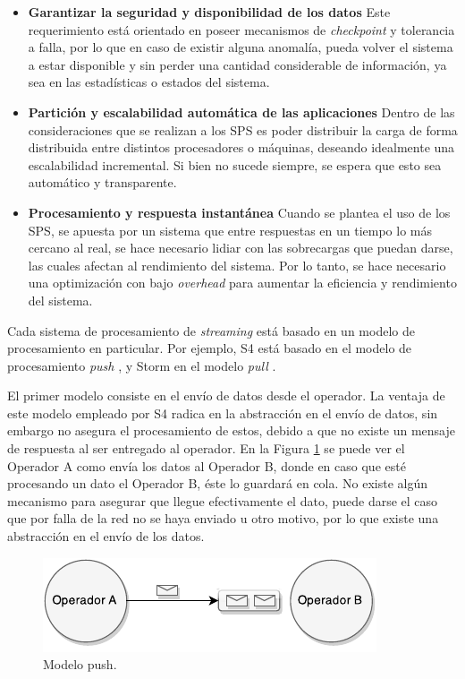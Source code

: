 \begin{itemize}
	\item \textbf{Garantizar la seguridad y disponibilidad de los datos} Este requerimiento está orientado en poseer mecanismos de \textit{checkpoint} y tolerancia a falla, por lo que en caso de existir alguna anomalía, pueda volver el sistema a estar disponible y sin perder una cantidad considerable de información, ya sea en las estadísticas o estados del sistema.
	\item \textbf{Partición y escalabilidad automática de las aplicaciones} Dentro de las consideraciones que se realizan a los SPS es poder distribuir la carga de forma distribuida entre distintos procesadores o máquinas, deseando idealmente una escalabilidad incremental. Si bien no sucede siempre, se espera que esto sea automático y transparente.
	\item \textbf{Procesamiento y respuesta instantánea} Cuando se plantea el uso de los SPS, se apuesta por un sistema que entre respuestas en un tiempo lo más cercano al real, se hace necesario lidiar con las sobrecargas que puedan darse, las cuales afectan al rendimiento del sistema. Por lo tanto, se hace necesario una optimización con bajo \textit{overhead} para aumentar la eficiencia y rendimiento del sistema.
\end{itemize}

Cada sistema de procesamiento de \textsl{streaming} está basado en un modelo de procesamiento en particular. Por ejemplo, S4 está basado en el modelo de procesamiento \textsl{push} \citep{s4yahoo}, y Storm en el modelo \textsl{pull} \citep{stormtwitter}.

El primer modelo consiste en el envío de datos desde el operador. La ventaja de este modelo empleado por S4 radica en la abstracción en el envío de datos, sin embargo no asegura el procesamiento de estos, debido a que no existe un mensaje de respuesta al ser entregado al operador. En la Figura \ref{fig:sps-push} se puede ver el Operador A como envía los datos al Operador B, donde en caso que esté procesando un dato el Operador B, éste lo guardará en cola. No existe algún mecanismo para asegurar que llegue efectivamente el dato, puede darse el caso que por falla de la red no se haya enviado u otro motivo, por lo que existe una abstracción en el envío de los datos.

\begin{figure}[ht!]
  \centering
    \includegraphics[scale=1]{images/SPS-Push.pdf}
  \caption{Modelo push.}
  \label{fig:sps-push}
\end{figure}

